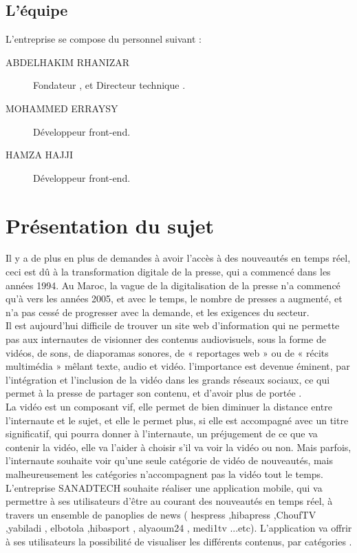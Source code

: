 \subsection{L'équipe}
L'entreprise se compose du personnel suivant :
\begin{description}
 \item[ABDELHAKIM RHANIZAR] Fondateur , et Directeur technique .
 \item[MOHAMMED ERRAYSY] Développeur front-end.
 \item[HAMZA HAJJI] Développeur front-end.
 \end{description} 


\section{Présentation du sujet}
Il y a de plus en plus de demandes à avoir l'accès à des nouveautés en temps réel, ceci est dû à la transformation digitale de la presse, qui a commencé dans les années 1994. Au Maroc, la vague de la digitalisation de la presse n'a commencé qu'à vers les années 2005, et avec le temps, le nombre de presses a augmenté, et n'a pas cessé de progresser avec la demande, et les exigences du secteur.\\[0.5cm]
Il est aujourd’hui difficile de trouver un site web d’information qui ne permette pas aux internautes de visionner des contenus audiovisuels, sous la forme de vidéos, de sons, de diaporamas sonores, de « reportages web » ou de « récits multimédia » mêlant texte, audio et vidéo. l'importance est devenue éminent, par l'intégration et l'inclusion de la vidéo dans les grands réseaux sociaux, ce qui permet à la presse de partager son contenu, et d'avoir plus de portée .\\[0.5cm]
La vidéo est un composant vif, elle permet de bien diminuer la distance entre l'internaute et le sujet, et elle le permet plus, si elle est accompagné avec un titre significatif, qui pourra donner à l'internaute, un préjugement de ce que va contenir la vidéo, elle va l'aider à choisir s'il va voir la vidéo ou non. Mais parfois, l'internaute souhaite voir qu'une seule catégorie de vidéo de nouveautés, mais malheureusement les catégories n'accompagnent pas la vidéo tout le temps.\\[0.5cm]
L'entreprise SANADTECH souhaite réaliser une application mobile, qui va permettre à ses utilisateurs d'être au courant des nouveautés en temps réel, à travers un ensemble de panoplies de news ( hespress ,hibapress ,ChoufTV ,yabiladi , elbotola ,hibasport , alyaoum24 , medi1tv ...etc). L'application va offrir à ses utilisateurs la possibilité de visualiser les différents contenus, par catégories 	.\\[1cm]
